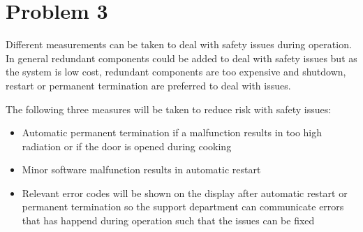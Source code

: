 \chapter{Problem 3}
\label{chp:three}


Different measurements can be taken to deal with safety issues during operation. In general redundant components could be added to deal with safety issues but as the system is low cost, redundant components are too expensive and shutdown, restart or permanent termination are preferred to deal with issues.

The following three measures will be taken to reduce risk with safety issues:

\begin{itemize}
	\item Automatic permanent termination if a malfunction results in too high radiation or if the door is opened during cooking
	\item Minor software malfunction results in automatic restart
	\item Relevant error codes will be shown on the display after automatic restart or permanent termination so the support department can communicate errors that has happend during operation such that the issues can be fixed
\end{itemize}